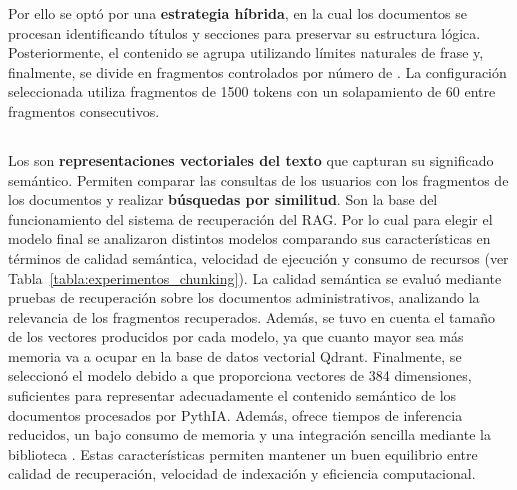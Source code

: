 Por ello se optó por una \textbf{estrategia híbrida}, en la cual
los documentos se procesan identificando títulos y secciones para preservar su estructura lógica. Posteriormente, el contenido se agrupa utilizando límites naturales de frase y, finalmente, se divide en fragmentos controlados por número de . La configuración seleccionada utiliza fragmentos de 1500 tokens con un solapamiento de 60  entre fragmentos consecutivos. 

\subsection{}

Los  son \textbf{representaciones vectoriales del texto} que capturan su significado semántico. Permiten comparar las consultas de los usuarios con los fragmentos de los documentos y realizar \textbf{búsquedas por similitud}. Son la base del funcionamiento del sistema de recuperación del RAG. Por lo cual para elegir el modelo final se analizaron distintos modelos comparando sus características en términos de calidad semántica, velocidad de ejecución y consumo de recursos (ver Tabla~\ref{tabla:experimentos_chunking}). La calidad semántica se evaluó mediante pruebas de recuperación sobre los documentos administrativos, analizando la relevancia de los fragmentos recuperados. Además, se tuvo en cuenta el tamaño de los vectores producidos por cada modelo, ya que cuanto mayor sea más memoria va a ocupar en la base de datos vectorial Qdrant. Finalmente, se seleccionó el modelo  debido a que proporciona vectores de 384 dimensiones, suficientes para representar adecuadamente el contenido semántico de los documentos procesados por PythIA. Además, ofrece tiempos de inferencia reducidos, un bajo consumo de memoria y una integración sencilla mediante la biblioteca . Estas características permiten mantener un buen equilibrio entre calidad de recuperación, velocidad de indexación y eficiencia computacional.

